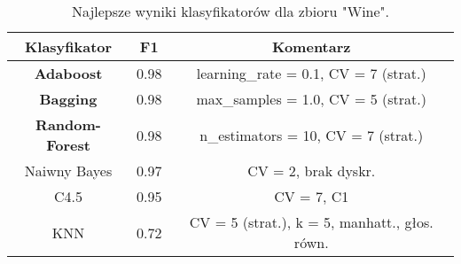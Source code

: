    \begin{table}[H]
        \center
        \begin{tabular}{|c|c|c|}
            \hline
            Klasyfikator & F1     & Komentarz \\ \hline
            \textbf{Adaboost}     & 0.98   & learning\_rate = 0.1, CV = 7 (strat.) \\ \hline
            \textbf{Bagging}      & 0.98   & max\_samples = 1.0, CV = 5 (strat.) \\ \hline
            \textbf{Random-Forest}& 0.98  & n\_estimators = 10, CV = 7 (strat.) \\ \hline

            Naiwny Bayes & 0.97   & CV = 2, brak dyskr.\\ \hline
            C4.5         & 0.95   & CV = 7, C1 \\ \hline
            KNN          & 0.72   & CV = 5 (strat.), k = 5, manhatt., głos. równ. \\ \hline
        \end{tabular}
        \caption{Najlepsze wyniki klasyfikatorów dla zbioru "Wine".}
    \end{table}
